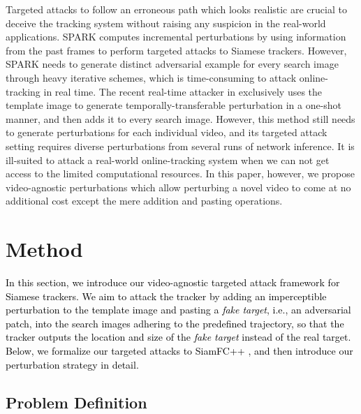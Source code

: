 \documentclass[journal]{IEEEtran}
\begin{document}
Targeted attacks to follow an erroneous path which looks realistic are crucial to deceive the tracking system without raising any suspicion in the real-world applications.
SPARK \cite{SPARK} computes incremental perturbations by using information from the past frames to perform targeted attacks to Siamese trackers. However, SPARK needs to generate distinct adversarial example for every search image through heavy iterative schemes, which is time-consuming to attack online-tracking in real time. The recent real-time attacker in \cite{TTP} exclusively uses the template image to generate temporally-transferable perturbation in a one-shot manner, and then adds it to every search image. However, this method still needs to generate perturbations for each individual video, and its targeted attack setting requires diverse perturbations from several runs of network inference. It is ill-suited to attack a real-world online-tracking system when we can not get access to the limited computational resources. In this paper, however, we propose video-agnostic perturbations which allow perturbing a novel video to come at no additional cost except the mere addition and pasting operations.

\section{Method}

\textcolor{black}{In this section, we introduce our video-agnostic targeted attack framework for Siamese trackers. We aim to attack the tracker by adding an imperceptible perturbation to the template image and pasting a \textit{fake target}, i.e., an adversarial patch, into the search images adhering to the predefined trajectory, so that the tracker outputs the location and size of the \textit{fake target} instead of the real target. Below, we formalize our targeted attacks to SiamFC++ \cite{SiamFC++}, and then introduce our perturbation strategy in detail.}
 
\subsection{Problem Definition}
\end{document}
